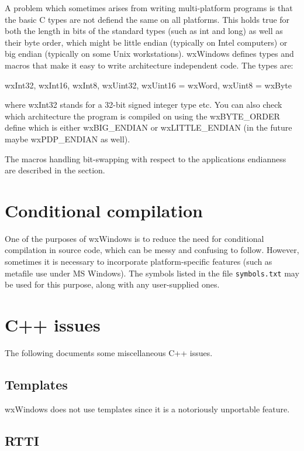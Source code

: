 A problem which sometimes arises from writing multi-platform programs is that
the basic C types are not defiend the same on all platforms. This holds true
for both the length in bits of the standard types (such as int and long) as 
well as their byte order, which might be little endian (typically
on Intel computers) or big endian (typically on some Unix workstations). wxWindows
defines types and macros that make it easy to write architecture independent
code. The types are:

wxInt32, wxInt16, wxInt8, wxUint32, wxUint16 = wxWord, wxUint8 = wxByte

where wxInt32 stands for a 32-bit signed integer type etc. You can also check
which architecture the program is compiled on using the wxBYTE\_ORDER define
which is either wxBIG\_ENDIAN or wxLITTLE\_ENDIAN (in the future maybe wxPDP\_ENDIAN
as well).

The macros handling bit-swapping with respect to the applications endianness
are described in the  section.

\section{Conditional compilation}

One of the purposes of wxWindows is to reduce the need for conditional
compilation in source code, which can be messy and confusing to follow.
However, sometimes it is necessary to incorporate platform-specific
features (such as metafile use under MS Windows). The symbols
listed in the file {\tt symbols.txt} may be used for this purpose,
along with any user-supplied ones.

\section{C++ issues}

The following documents some miscellaneous C++ issues.

\subsection{Templates}

wxWindows does not use templates since it is a notoriously unportable feature.

\subsection{RTTI}

